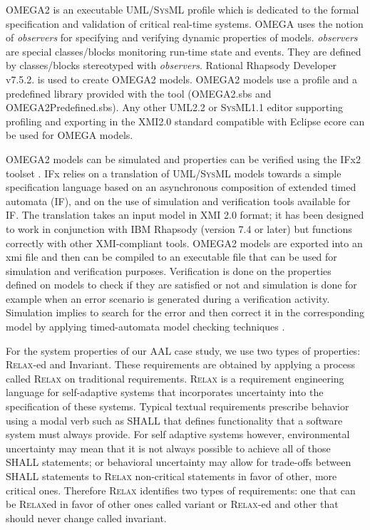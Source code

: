 \documentclass[a4paper,twoside]{article}
\def\myrelax{\textsc{Relax}}                  %
\def\sysml{\textsc{SysML}}
\def\uml{\textsc{UML}}
\begin{document}
OMEGA2 \cite{test2} is an executable UML/\sysml{} profile which is dedicated to the formal specification and validation of critical real-time systems. OMEGA uses the notion of \textit{observers} \cite{test2} for specifying and verifying dynamic properties of models. \textit{observers} are special classes/blocks monitoring run-time state and events. They are defined by classes/blocks stereotyped with \textit{observers}. Rational Rhapsody Developer v7.5.2. \cite{test3} is used to create OMEGA2 models. OMEGA2 models use a profile and a predefined library provided with the tool (OMEGA2.sbs and OMEGA2Predefined.sbs). Any other \uml{}2.2 or \sysml{}1.1 editor supporting profiling and exporting in the XMI2.0 standard compatible with Eclipse ecore can be used for OMEGA models. 

OMEGA2 models can be simulated and properties can be verified using the IFx2 toolset \cite{test4}. IFx relies on a translation of \uml{}/\sysml{} models towards a simple specification language based on an asynchronous composition of extended timed automata (IF), and on the use of simulation and verification tools available for IF. The translation takes an input model in XMI 2.0 format; it has been designed to work in conjunction with IBM Rhapsody (version 7.4 or later) but functions correctly with other XMI-compliant tools. OMEGA2 models are exported into an xmi file and then can be compiled to an executable file that can be used for simulation and verification purposes. Verification is done on the properties defined on models to check if they are satisfied or not and simulation is done for example when an error scenario is generated during a verification activity. Simulation implies to search for the error and then correct it in the corresponding model  by applying timed-automata model checking techniques \cite{test5}.

For the system properties of our AAL case study, we use two types of properties: \myrelax{}-ed and Invariant. These requirements are obtained by applying a process called  \myrelax{} \cite{test6} on traditional requirements. \myrelax{}  is  a  requirement  engineering language for self-adaptive systems that incorporates uncertainty into the specification of these systems. Typical  textual  requirements  prescribe behavior  using  a  modal  verb  such  as  SHALL  that defines  functionality  that  a  software  system  must always provide. For self adaptive systems however, environmental  uncertainty  may  mean  that  it  is  not always  possible  to  achieve  all  of  those  SHALL statements; or behavioral uncertainty may allow for trade-offs between SHALL statements to \myrelax{} non-critical  statements  in  favor  of  other,  more  critical ones.  Therefore  \myrelax{}  identifies  two  types  of requirements:  one  that  can  be  \myrelax{}ed  in  favor  of other ones called variant or \myrelax{}-ed and other that should never change called invariant.
\end{document}
